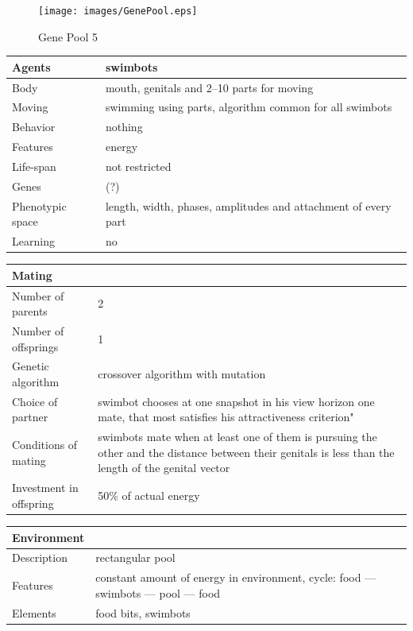 \documentclass[a4paper,12pt]{report}
\begin{document}
\begin{figure}
\begin{center}
  \texttt{[image: images/GenePool.eps]}
  \caption{Gene Pool 5}
  \label{img.GenePool}
\end{center}
\end{figure}
  
\vspace{20pt}
\begin{tabular}{|p{150pt}|p{220pt}|}
\hline
\textbf{Agents}&swimbots\\ \hline
Body&mouth, genitals and 2--10 parts for moving\\ \hline
Moving&swimming using parts, algorithm common for all swimbots\\ \hline
Behavior&nothing\\ \hline
Features&energy\\ \hline
Life-span&not restricted\\ \hline
Genes&(?)\\ \hline
Phenotypic space&length, width, phases, amplitudes and attachment of every part\\ \hline
Learning&no\\ \hline
\end{tabular} 

\vspace{10pt}
\begin{tabular}{|p{150pt}|p{220pt}|} \hline \textbf{Mating}&\\ \hline
Number of parents&2\\ \hline
Number of offsprings&1\\ \hline
Genetic algorithm&crossover algorithm with mutation\\ \hline
Choice of partner&swimbot chooses at one snapshot in his view horizon one mate, that most satisfies his attractiveness criterion"\\ \hline
Conditions of mating&swimbots mate when at least one of them is pursuing the other and the distance between their genitals is less than the length of the genital vector\\ \hline
Investment in offspring&50\% of actual energy\\ \hline
\end{tabular} 

\vspace{10pt}
\begin{tabular}{|p{150pt}|p{220pt}|} \hline \textbf{Environment}&\\ \hline
Description&rectangular pool\\ \hline
Features&constant amount of energy in environment, cycle: food --- swimbots --- pool --- food\\ \hline
Elements&food bits, swimbots\\ \hline
\end{tabular} 
\end{document}
